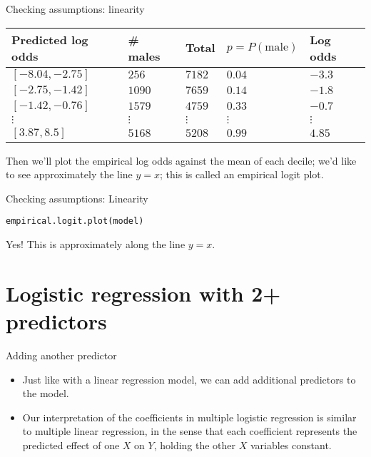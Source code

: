 \documentclass{beamer}\usepackage[]{graphicx}\usepackage[]{color}
\makeatletter
\newcommand{\hlstd}[1]{\textcolor[rgb]{1,0.894,0.769}{#1}}%
\newcommand{\hlkwd}[1]{\textcolor[rgb]{1,0.78,0.769}{#1}}%
\newenvironment{kframe}{%
 \def\at@end@of@kframe{}%
 \ifinner\ifhmode%
  \def\at@end@of@kframe{\end{minipage}}%
  \begin{minipage}{\columnwidth}%
 \fi\fi%
 \def\FrameCommand##1{\hskip\@totalleftmargin \hskip-\fboxsep
 \colorbox{shadecolor}{##1}\hskip-\fboxsep
     \hskip-\linewidth \hskip-\@totalleftmargin \hskip\columnwidth}%
 \MakeFramed {\advance\hsize-\width
   \@totalleftmargin\z@ \linewidth\hsize
   \@setminipage}}%
 {\par\unskip\endMakeFramed%
 \at@end@of@kframe}
\newenvironment{knitrout}{}{} %
\makeatother
\begin{document}
\begin{darkframes}
\begin{frame}{Checking assumptions: linearity}
      \begin{center}
        \begin{tabular}{lllll}
          Predicted log odds & \# males & Total & $p=P(\text{male})$ & Log odds \\
          \hline
          $[ -8.04, -2.75 ]$ & $256$ &  $7182$ & $0.04$ & $-3.3$ \\
          $[ -2.75, -1.42 ]$ & $1090$ &  $7659$ & $0.14$ & $-1.8$ \\
          $[ -1.42, -0.76 ]$ & $1579$ &  $4759$ & $0.33$ & $-0.7$ \\
          $\vdots$ & $\vdots$ & $\vdots$ & $\vdots$ & $\vdots$ \\
          $[ 3.87, 8.5 ]$ & $5168$ &  $5208$ & $0.99$ & $4.85$ \\

        \end{tabular}
      \end{center}

      Then we'll plot the empirical log odds against the mean of each decile; we'd like to see approximately the line $y=x$; this is called an \alert{empirical logit plot}.
    \end{frame}

    \begin{frame}[fragile]{Checking assumptions: Linearity}
\begin{knitrout}
\begin{kframe}
\begin{alltt}
\hlkwd{empirical.logit.plot}\hlstd{(model)}
\end{alltt}
\end{kframe}


\end{knitrout}
      \pause\vspace{-0.5cm}
      \greencheckmark \alert{Yes!} This is approximately along the line $y=x$.
    \end{frame}

    \section{Logistic regression with 2+ predictors}

    \begin{frame}{Adding another predictor}
      \begin{itemize}
        \item Just like with a linear regression model, we can add additional predictors to the model.
        \item Our interpretation of the coefficients in multiple logistic regression is similar to multiple linear regression, in the sense that each coefficient represents the predicted effect of one $X$ on $Y$, holding the other $X$ variables constant.
      \end{itemize}
    \end{frame}


\end{darkframes}
\end{document}
